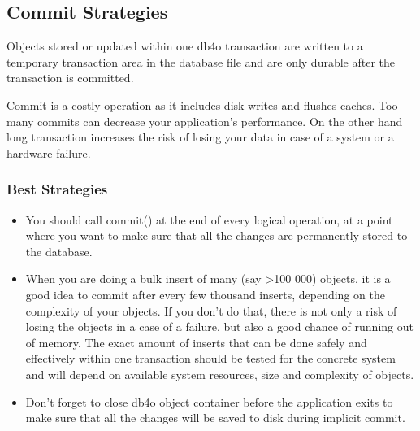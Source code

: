 \subsection{Commit Strategies}
\label{ref:troubleshoot-commit-strategies}

Objects stored or updated within one db4o transaction are written to a temporary transaction area in the database file and are only durable after the transaction is committed.

Commit is a costly operation as it includes disk writes and flushes caches. Too many commits can decrease your application's performance. On the other hand long transaction increases the risk of losing your data in case of a system or a hardware failure.

\subsubsection*{Best Strategies}

\begin{itemize}
\item You should call commit() at the end of every logical operation, at a point where you want to make sure that all the changes are permanently stored to the database.
\item When you are doing a bulk insert of many (say \textgreater{}100 000) objects, it is a good idea to commit after every few thousand inserts, depending on the complexity of your objects. If you don't do that, there is not only a risk of losing the objects in a case of a failure, but also a good chance of running out of memory. The exact amount of inserts that can be done safely and effectively within one transaction should be tested for the concrete system and will depend on available system resources, size and complexity of objects.
\item Don't forget to close db4o object container before the application exits to make sure that all the changes will be saved to disk during implicit commit.
\end{itemize}

